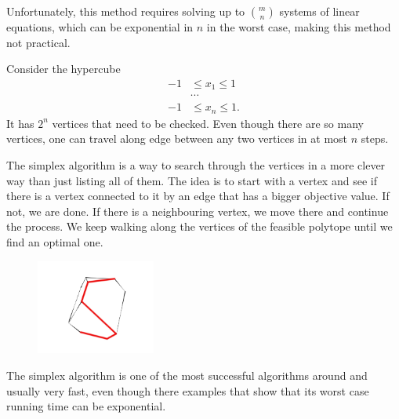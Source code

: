 Unfortunately, this method requires solving up to $\binom{m}{n}$ systems of linear equations, which can be exponential in $n$ in the worst case, making this method not practical. 

\begin{example}
Consider the hypercube
\begin{align*}
 -1&\leq x_1\leq 1\\
 &\cdots\\
 -1&\leq x_n\leq 1.
\end{align*}
It has $2^n$ vertices that need to be checked. Even though there are so many vertices, one can travel along edge between any two vertices in at most $n$ steps.
\end{example}


The simplex algorithm is a way to search through the vertices in a more clever way than just listing all of them. The idea is to start with a vertex and see if there is a vertex connected to it by an edge that has a bigger objective value. If not, we are done. If there is a neighbouring vertex, we move there and continue the process. We keep walking along the vertices of the feasible polytope until we find an optimal one.
\begin{figure}[h!]
\centering
 \includegraphics[width=0.35\textwidth]{images/durerpath.jpg}
\end{figure}
The simplex algorithm is one of the most successful algorithms around and usually very fast, even though there examples that show that its worst case running time can be exponential.



